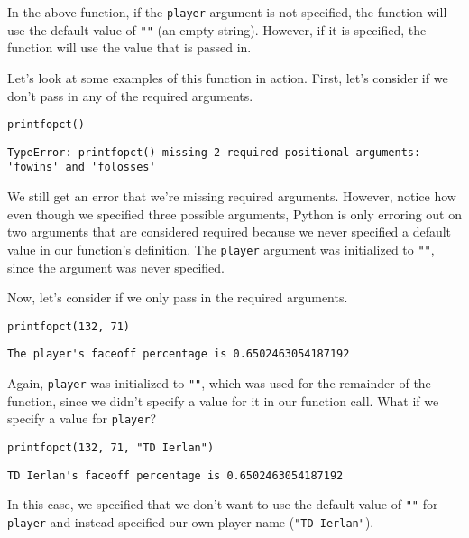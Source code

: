 In the above function, if the \verb|player| argument is not specified, the function will use the default value of \verb|""| (an empty string). However, if it is specified, the function will use the value that is passed in.\par
Let's look at some examples of this function in action. First, let's consider if we don't pass in any of the required arguments.\par
\begin{lstlisting}[style=pippython]
printfopct()
\end{lstlisting}
\begin{lstlisting}[style=pippython]
TypeError: printfopct() missing 2 required positional arguments: 'fowins' and 'folosses'
\end{lstlisting}
We still get an error that we're missing required arguments. However, notice how even though we specified three possible arguments, Python is only erroring out on two arguments that are considered required because we never specified a default value in our function's definition. The \verb|player| argument was initialized to \verb|""|, since the argument was never specified.\par
Now, let's consider if we only pass in the required arguments.\par
\begin{lstlisting}[style=pippython]
printfopct(132, 71)
\end{lstlisting}
\begin{lstlisting}[style=none]
The player's faceoff percentage is 0.6502463054187192
\end{lstlisting}
Again, \verb|player| was initialized to \verb|""|, which was used for the remainder of the function, since we didn't specify a value for it in our function call. What if we specify a value for \verb|player|?\par
\begin{lstlisting}[style=pippython]
printfopct(132, 71, "TD Ierlan")
\end{lstlisting}
\begin{lstlisting}[style=none]
TD Ierlan's faceoff percentage is 0.6502463054187192
\end{lstlisting}
In this case, we specified that we don't want to use the default value of \verb|""| for \verb|player| and instead specified our own player name (\verb|"TD Ierlan"|).
